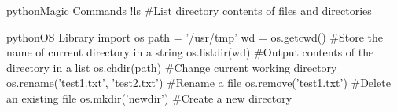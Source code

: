 \begin{codebox}{python}{Magic Commands}
!ls  #List directory contents of files and directories
\end{codebox}

\begin{codebox}{python}{OS Library}
import os
path = '/usr/tmp'
wd = os.getcwd()  #Store the name of current directory in a string
os.listdir(wd)  #Output contents of the directory in a list
os.chdir(path)  #Change current working directory
os.rename('test1.txt', 'test2.txt')  #Rename a file
os.remove('test1.txt')  #Delete an existing file
os.mkdir('newdir')  #Create a new directory
\end{codebox}
